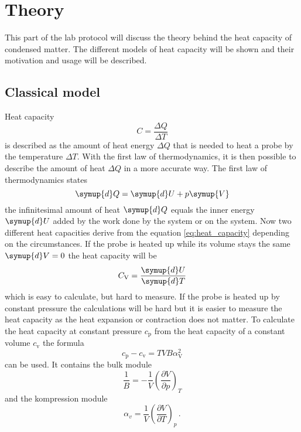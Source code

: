 \section{Theory}
\label{sec:theorie}
This part of the lab protocol will discuss the theory behind the heat capacity of condensed matter.
The different models of heat capacity will be shown and their motivation and usage will be described.
\subsection{Classical model}
Heat capacity 
\begin{equation}
    C = \frac{\Delta Q}{\Delta T}
    \label{eq:heat_capacity}
\end{equation}
is described as the amount of heat energy $\Delta Q$ that is needed to heat a probe by the temperature $\Delta T$.
With the first law of thermodynamics, it is then possible to describe the amount of heat $\Delta Q$ in a more accurate way.
The first law of thermodynamics states 
\begin{equation*}
    \symup{d}Q = \symup{d}U + p\symup{V}
\end{equation*}
the infinitesimal amount of heat $\symup{d}Q$ equals the inner energy $\symup{d}U$ added by the work done by the system or on the system.
Now two different heat capacities derive from the equation \eqref{eq:heat_capacity} depending on the circumstances.
If the probe is heated up while its volume stays the same $\symup{d}V=0$ the heat capacity will be 
\begin{equation}
    C_\text{V} = \frac{\symup{d}U}{\symup{d}T}
    \label{eq:heat_cap_v}
\end{equation}
which is easy to calculate, but hard to measure.
If the probe is heated up by constant pressure the calculations will be hard but it is easier to measure the heat capacity as the heat expansion or contraction does not matter.
To calculate the heat capacity at constant pressure $c_\text{p}$ from the heat capacity of a constant volume $c_\text{v}$ the formula
\begin{equation}
    c_\text{p} - c_\text{v} = TVB\alpha_\text{V}^2
    \label{eq:correction_formula}
\end{equation}
can be used.
It contains the bulk module 
\begin{equation*}
\frac{1}{B} = - \frac{1}{V} \left (\frac{\partial  V}{\partial p} \right )_T
\end{equation*}
and the kompression module
\begin{equation*}
    \alpha_v = \frac{1}{V} \left( \frac{\partial V}{\partial T}\right )_p\, .
\end{equation*}
